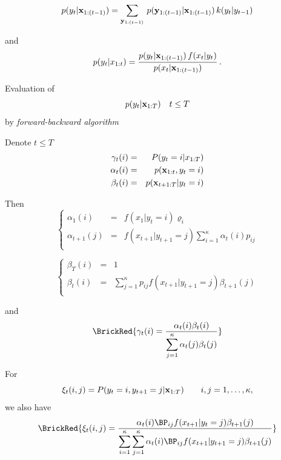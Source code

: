 \begin{slide}
\end{slide}\begin{slide}
$$
p(y_t|\mathbf{x}_{1:(t-1)}) = \sum_{\mathbf{y}_{1:(t-1)}}\, p(\mathbf{y}_{1:(t-1)}|\mathbf{x}_{1:(t-1)})\, k(y_t|y_{t-1})
$$

and
$$
p(y_t|x_{1:t}) = \frac{p(y_t|\mathbf{x}_{1:(t-1)})\,f(x_t|y_t)}{p(x_t|\mathbf{x}_{1:(t-1)})}\,.
$$

\end{slide}\begin{slide}

Evaluation of 
$$
p(y_t | \mathbf{x}_{1:T}) \quad t \le T
$$
by {\em forward-backward algorithm} 

\pause
Denote $t \le T$
\begin{eqnarray*}
\gamma_t(i) &=& P(y_t = i | x_{1:T}) \\
\alpha_t(i) &=& p(\mathbf{x}_{1:t}, y_t = i)  \\ 
\beta_t(i) &=& p(\mathbf{x}_{t+1:T}|y_t=i)
\end{eqnarray*}

\end{slide}\begin{slide}
Then\small
\[
  {\left\{\begin{array}{lcl}
  \alpha_1(i) & = & f(x_1|y_t = i) \varrho_i\\
  \alpha_{t+1}(j) & = & {\displaystyle f(x_{t+1}|y_{t+1}=j) 
      \sum_{i=1}^{\kappa}\alpha_{t}(i) p_{ij}}\\
  \end{array}\right.}
\]

\[
  {\left\{\begin{array}{lcl}
  \beta_T(i) & = & 1\\
  \beta_{t}(i) & = & {\displaystyle \sum_{j=1}^{\kappa} p_{ij}} 
  f(x_{t+1}|y_{t+1}=j) \beta_{t+1}(j)\\
  \end{array}\right.}
\]

and\normalsize
\[
  \label{imos}\BrickRed{
  {\gamma_t(i) = \frac{\alpha_t(i)\beta_t(i)}{\displaystyle 
  \sum_{j=1}^{\kappa} \alpha_t(j)\beta_t(j)}}}
\]

\end{slide}\begin{slide}
For
$$
  \xi_t(i,j) = P(y_t =i, y_{t+1} = j|\mathbf{x}_{1:T}) \qquad i,j=1,\ldots,\kappa,
$$
we also have
$$\BrickRed{
     {\xi_t(i,j) = \frac{\alpha_t(i)\BP_{ij}f(x_{t+1}|y_t=j)
     \beta_{t+1}(j)}{\displaystyle \sum_{i=1}^\kappa\sum_{j=1}^\kappa
     \alpha_t(i)\BP_{ij}f(x_{t+1}|y_{t+1}=j)\beta_{t+1}(j)}}}
$$


\end{slide}
